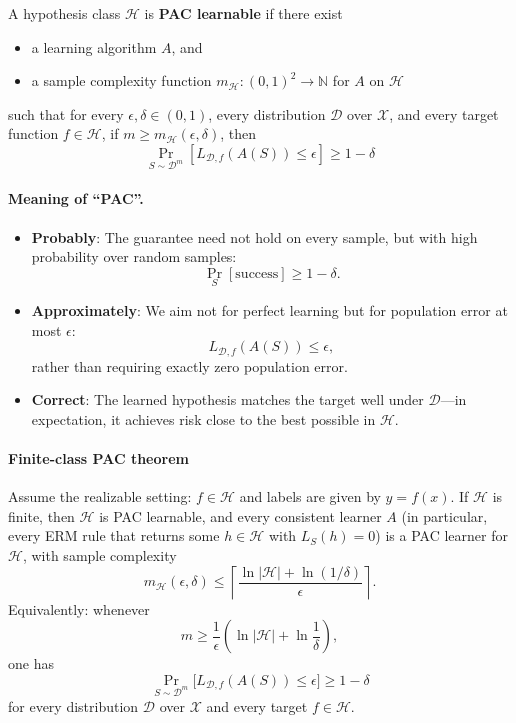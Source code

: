 \documentclass[11pt,a4paper]{article}
\theoremstyle{definition}
\begin{document}
\begin{definition}
A hypothesis class $\mathcal{H}$ is \textbf{PAC learnable} if there exist
\begin{itemize}
    \item a learning algorithm $A$, and
    \item a sample complexity function $m_{\mathcal{H}} : (0, 1)^2 \to \mathbb{N}$ for $A$ on $\mathcal{H}$
\end{itemize}
such that for every $\epsilon, \delta \in (0,1)$, every distribution $\mathcal{D}$ over $\mathcal{X}$, and every target function $f \in \mathcal{H}$, if $m \geq m_{\mathcal{H}}(\epsilon, \delta)$, then
\begin{equation}\tag{PAC}
\Pr_{S \sim \mathcal{D}^m} \left[ L_{\mathcal{D}, f}(A(S)) \leq \epsilon \right] \geq 1 - \delta
\end{equation}
\end{definition}

\paragraph{Meaning of ``PAC''.}
\begin{itemize}
    \item \textbf{Probably}: The guarantee need not hold on every sample, but with high probability over random samples:
    \[
    \Pr_{S}[\text{success}] \geq 1 - \delta.
    \]
    \item \textbf{Approximately}: We aim not for perfect learning but for population error at most $\epsilon$:
    \[
    L_{\mathcal{D},f}(A(S)) \leq \epsilon,
    \]
    rather than requiring exactly zero population error.
    \item \textbf{Correct}: The learned hypothesis matches the target well under $\mathcal{D}$---in expectation, it achieves risk close to the best possible in $\mathcal{H}$.
\end{itemize}


\paragraph{Finite-class PAC theorem}

\begin{theorem}
Assume the realizable setting: \(f \in \mathcal{H}\) and labels are given by \(y = f(x)\).
If \(\mathcal{H}\) is finite, then \(\mathcal{H}\) is PAC learnable, and every consistent learner
\(A\) (in particular, every ERM rule that returns some \(h \in \mathcal{H}\) with \(L_S(h) = 0\))
is a PAC learner for \(\mathcal{H}\), with sample complexity
\[
m_{\mathcal{H}}(\epsilon, \delta) \leq \left\lceil \frac{\ln |\mathcal{H}| + \ln(1/\delta)}{\epsilon} \right\rceil.
\]
Equivalently: whenever
\[
m \geq \frac{1}{\epsilon} \left( \ln |\mathcal{H}| + \ln \frac{1}{\delta} \right),
\]
one has
\[
\Pr_{S \sim \mathcal{D}^m}\bigl[L_{\mathcal{D},f}(A(S)) \leq \epsilon\bigr] \geq 1 - \delta
\]
for every distribution \(\mathcal{D}\) over \(\mathcal{X}\) and every target \(f \in \mathcal{H}\).
\end{theorem}
\end{document}
